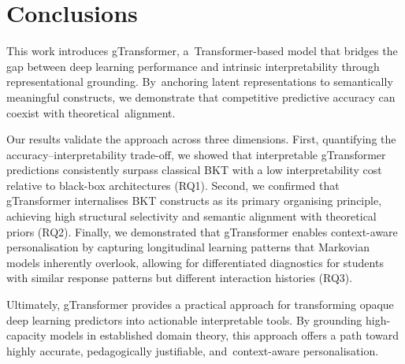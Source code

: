 \documentclass[applsci,article,accept,moreauthors,pdftex]{Definitions/mdpi}
\begin{document}
\section{Conclusions} \label{sec_conclusions}

This work introduces gTransformer, a~Transformer-based model that bridges the gap between deep learning performance and intrinsic interpretability through representational grounding. By~anchoring latent representations to semantically meaningful constructs, we demonstrate that competitive predictive accuracy can coexist with theoretical~alignment.

Our results validate the approach across three dimensions. First, quantifying the accuracy--interpretability trade-off, we showed that interpretable gTransformer predictions consistently surpass classical BKT with a low interpretability cost relative to black-box architectures (RQ1). Second, we confirmed that gTransformer {internalises} BKT constructs as its primary {organising} principle, achieving high structural selectivity and semantic alignment with theoretical priors (RQ2). Finally, we demonstrated that gTransformer enables context-aware {personalisation} by capturing longitudinal learning patterns that Markovian models inherently overlook, allowing for differentiated diagnostics for students with similar response patterns but different interaction histories (RQ3).

Ultimately, gTransformer provides a practical approach for transforming opaque deep learning predictors into actionable interpretable tools. {By grounding high-capacity models in established domain theory, this approach offers a path toward highly accurate, pedagogically justifiable, and~context-aware personalisation.}

\vspace{6pt} 



\end{document}
